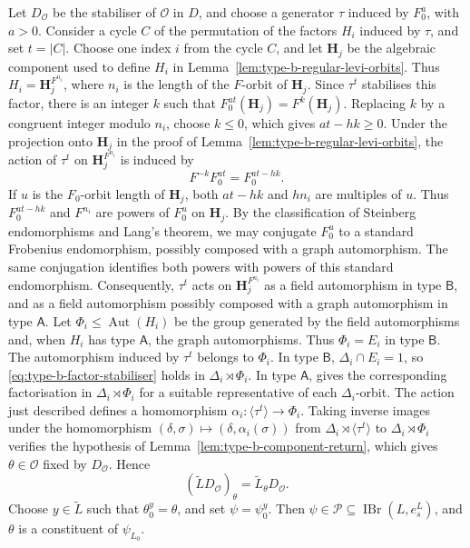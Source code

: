 \documentclass[10pt]{amsart}
\theoremstyle{definition}
\renewcommand{\leq}{\leqslant}
\renewcommand{\geq}{\geqslant}
\let\oldendproof\endproof
\renewenvironment{proof}[1][\proofname]{%
  \oldproof[\bfseries #1]%
}{\oldendproof}
\DeclareMathOperator{\Aut}{Aut}
\DeclareMathOperator{\IBr}{IBr}
\numberwithin{equation}{section}
\numberwithin{table}{section}
\begin{document}
\begin{proof}
Let $D_{\mathcal O}$ be the stabiliser of $\mathcal O$ in $D$, and
choose a generator $\tau$ induced by $F_0^a$, with $a>0$.
Consider a cycle $C$ of the permutation of the factors $H_i$
induced by $\tau$, and set
$t=|C|$. Choose one index $i$ from the cycle $C$, and let
$\mathbf H_j$ be the algebraic component used to define $H_i$ in
Lemma~\ref{lem:type-b-regular-levi-orbits}.
Thus $H_i=\mathbf H_j^{F^{n_i}}$, where $n_i$ is the length of the
$F$-orbit of $\mathbf H_j$.
Since $\tau^t$ stabilises this factor, there is an integer $k$ such
that $F_0^{at}(\mathbf H_j)=F^k(\mathbf H_j)$.
Replacing $k$ by a congruent integer modulo $n_i$, choose $k\leq0$,
which gives $at-hk\geq0$.
Under the projection onto $\mathbf H_j$ in the proof of
Lemma~\ref{lem:type-b-regular-levi-orbits}, the action of $\tau^t$ on
$\mathbf H_j^{F^{n_i}}$ is induced by
\[
 F^{-k}F_0^{at}=F_0^{at-hk}.
\]
If $u$ is the $F_0$-orbit length of $\mathbf H_j$, both $at-hk$
and $hn_i$ are multiples of $u$.
Thus $F_0^{at-hk}$ and $F^{n_i}$ are powers of $F_0^u$ on
$\mathbf H_j$.
By the classification of Steinberg endomorphisms
\cite[Theorem~22.5]{MalleTesterman2011} and Lang's theorem,
we may conjugate $F_0^u$ to a standard Frobenius endomorphism, possibly
composed with a graph automorphism.
The same conjugation identifies both powers with powers of this
standard endomorphism.
Consequently, $\tau^t$ acts on $\mathbf H_j^{F^{n_i}}$ as a field
automorphism in type $\mathsf B$, and as a field automorphism possibly
composed with a graph automorphism in type $\mathsf A$.
Let $\Phi_i\leq\Aut(H_i)$ be the group generated by the field
automorphisms and, when $H_i$ has type $\mathsf A$, the graph
automorphisms. Thus $\Phi_i=E_i$ in type $\mathsf B$.
The automorphism induced by $\tau^t$ belongs to $\Phi_i$.
In type $\mathsf B$,
$\Delta_i\cap E_i=1$, so \eqref{eq:type-b-factor-stabiliser} holds in
$\Delta_i\rtimes\Phi_i$. In type $\mathsf A$,
\cite[Theorem~8.1]{FengLiZhang2021Equivariant} gives the corresponding
factorisation in $\Delta_i\rtimes\Phi_i$ for a suitable representative
of each $\Delta_i$-orbit. The action just described defines a homomorphism
$\alpha_i:\langle\tau^t\rangle\longrightarrow\Phi_i$.
Taking inverse images under the homomorphism
$(\delta,\sigma)\longmapsto(\delta,\alpha_i(\sigma))$ from
$\Delta_i\rtimes\langle\tau^t\rangle$ to $\Delta_i\rtimes\Phi_i$
verifies the hypothesis of Lemma~\ref{lem:type-b-component-return},
which gives $\theta\in\mathcal O$ fixed by $D_{\mathcal O}$. Hence
\[
 (\widetilde L D_{\mathcal O})_\theta
 =\widetilde L_\theta D_{\mathcal O}.
\]
Choose $y\in\widetilde L$ such that $\theta_0^y=\theta$, and set
$\psi=\psi_0^y$. Then $\psi\in\mathcal P\subseteq\IBr(L,e_s^L)$,
and $\theta$ is a constituent of $\psi_{L_0}$.


\end{proof}
\end{document}
